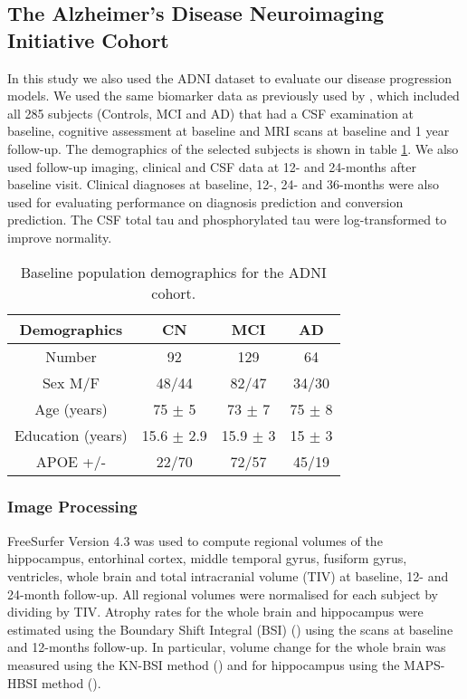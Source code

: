 \subsection{The Alzheimer's Disease Neuroimaging Initiative Cohort}

In this study we also used the ADNI dataset to evaluate our disease progression models. We used the same biomarker data as previously used by \cite{young2014data}, which included all 285 subjects (Controls, MCI and AD) that had a CSF examination at baseline, cognitive assessment at baseline and MRI scans at baseline and 1 year follow-up. The demographics of the selected subjects is shown in table \ref{tab:adniDemographics}. We also used follow-up imaging, clinical and CSF data at 12- and 24-months after baseline visit. Clinical diagnoses at baseline, 12-, 24- and 36-months were also used for evaluating performance on diagnosis prediction and conversion prediction. The CSF total tau and phosphorylated tau were log-transformed to improve normality. 

\begin{table}[ht]
\centering
 \begin{tabular}{c | c c c}
  Demographics & CN & MCI & AD\\
  \hline
  Number & 92 & 129 & 64\\
  Sex M/F & 48/44 & 82/47 & 34/30\\
  Age (years) & 75 $\pm$ 5 & 73 $\pm$ 7 & 75 $\pm$ 8\\
  Education (years) & 15.6 $\pm$ 2.9 & 15.9 $\pm$ 3 & 15 $\pm$ 3\\
  APOE +/- & 22/70 & 72/57 & 45/19\\
 \end{tabular}
 \caption[Baseline population demographics for the ADNI cohort.]{Baseline population demographics for the ADNI cohort.}
 \label{tab:adniDemographics}
\end{table}

\subsubsection{Image Processing}

FreeSurfer Version 4.3 was used to compute regional volumes of the hippocampus, entorhinal cortex, middle temporal gyrus, fusiform gyrus, ventricles, whole brain and total intracranial volume (TIV) at baseline, 12- and 24-month follow-up. All regional volumes were normalised for each subject by dividing by TIV. Atrophy rates for the whole brain and hippocampus were estimated using the Boundary Shift Integral (BSI) (\cite{freeborough1997boundary}) using the scans at baseline and 12-months follow-up. In particular, volume change for the whole brain was measured using the KN-BSI method (\cite{leung2010robust}) and for hippocampus using the MAPS-HBSI method (\cite{leung2010automated}). 

